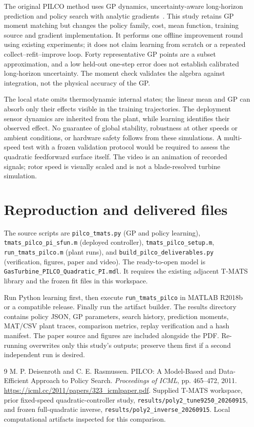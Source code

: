 \documentclass[11pt,a4paper]{article}
\begin{document}
The original PILCO method uses GP dynamics, uncertainty-aware long-horizon prediction and policy search with analytic gradients~\cite{pilco}. This study retains GP moment matching but changes the policy family, cost, mean function, training source and gradient implementation. It performs one offline improvement round using existing experiments; it does not claim learning from scratch or a repeated collect--refit--improve loop. Forty representative GP points are a subset approximation, and a low held-out one-step error does not establish calibrated long-horizon uncertainty. The moment check validates the algebra against integration, not the physical accuracy of the GP.

The local state omits thermodynamic internal states; the linear mean and GP can absorb only their effects visible in the training trajectories. The deployment sensor dynamics are inherited from the plant, while learning identifies their observed effect. No guarantee of global stability, robustness at other speeds or ambient conditions, or hardware safety follows from these simulations. A multi-speed test with a frozen validation protocol would be required to assess the quadratic feedforward surface itself. The video is an animation of recorded signals; rotor speed is visually scaled and is not a blade-resolved turbine simulation.

\section{Reproduction and delivered files}
The source scripts are \texttt{pilco\_tmats.py} (GP and policy learning), \texttt{tmats\_pilco\_pi\_sfun.m} (deployed controller), \texttt{tmats\_pilco\_setup.m}, \texttt{run\_tmats\_pilco.m} (plant runs), and \texttt{build\_pilco\_deliverables.py} (verification, figures, paper and video). The ready-to-open model is \texttt{GasTurbine\_PILCO\_Quadratic\_PI.mdl}. It requires the existing adjacent T-MATS library and the frozen fit files in this workspace.

Run Python learning first, then execute \texttt{run\_tmats\_pilco} in MATLAB R2018b or a compatible release. Finally run the artifact builder. The results directory contains policy JSON, GP parameters, search history, prediction moments, MAT/CSV plant traces, comparison metrics, replay verification and a hash manifest. The paper source and figures are included alongside the PDF. Re-running overwrites only this study's outputs; preserve them first if a second independent run is desired.

\begin{thebibliography}{9}
 M. P. Deisenroth and C. E. Rasmussen. PILCO: A Model-Based and Data-Efficient Approach to Policy Search. \emph{Proceedings of ICML}, pp. 465--472, 2011. \url{https://icml.cc/2011/papers/323_icmlpaper.pdf}.
 Supplied T-MATS workspace, prior fixed-speed quadratic-controller study, \texttt{results/poly2\_tune9250\_20260915}, and frozen full-quadratic inverse, \texttt{results/poly2\_inverse\_20260915}. Local computational artifacts inspected for this comparison.
\end{thebibliography}
\end{document}
